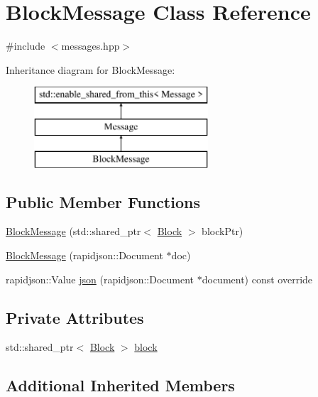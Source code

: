 \hypertarget{classBlockMessage}{}\section{Block\+Message Class Reference}
\label{classBlockMessage}


{\ttfamily \#include $<$messages.\+hpp$>$}

Inheritance diagram for Block\+Message\+:\begin{figure}[H]
\begin{center}
\leavevmode
\includegraphics[height=3.000000cm]{classBlockMessage}
\end{center}
\end{figure}
\subsection*{Public Member Functions}
\begin{DoxyCompactItemize}
\item 
\mbox{\hyperlink{classBlockMessage_aac9856415dfd620f66e669e119e04af2}{Block\+Message}} (std\+::shared\+\_\+ptr$<$ \mbox{\hyperlink{classBlock}{Block}} $>$ block\+Ptr)
\item 
\mbox{\hyperlink{classBlockMessage_a8c3d6ddc50c03e4e9ddf22bead092dec}{Block\+Message}} (rapidjson\+::\+Document $\ast$doc)
\item 
rapidjson\+::\+Value \mbox{\hyperlink{classBlockMessage_afe33ddfdae83a25d98dd28541bc2fcfe}{json}} (rapidjson\+::\+Document $\ast$document) const override
\end{DoxyCompactItemize}
\subsection*{Private Attributes}
\begin{DoxyCompactItemize}
\item 
std\+::shared\+\_\+ptr$<$ \mbox{\hyperlink{classBlock}{Block}} $>$ \mbox{\hyperlink{classBlockMessage_a546ae4b4e006de9e2776f4f2a40f3b9d}{block}}
\end{DoxyCompactItemize}
\subsection*{Additional Inherited Members}


